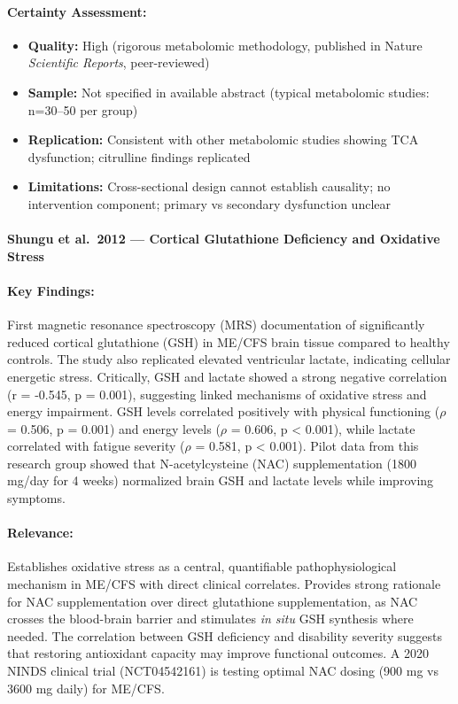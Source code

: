 \paragraph{Certainty Assessment:}
\begin{itemize}
    \item \textbf{Quality:} High (rigorous metabolomic methodology, published in Nature \emph{Scientific Reports}, peer-reviewed)
    \item \textbf{Sample:} Not specified in available abstract (typical metabolomic studies: n=30--50 per group)
    \item \textbf{Replication:} Consistent with other metabolomic studies showing TCA dysfunction; citrulline findings replicated
    \item \textbf{Limitations:} Cross-sectional design cannot establish causality; no intervention component; primary vs secondary dysfunction unclear
\end{itemize}

\paragraph{Shungu et al.\ 2012 --- Cortical Glutathione Deficiency and Oxidative Stress}

\cite{Shungu2012glutathione}

\paragraph{Key Findings:}
First magnetic resonance spectroscopy (MRS) documentation of significantly reduced cortical glutathione (GSH) in ME/CFS brain tissue compared to healthy controls. The study also replicated elevated ventricular lactate, indicating cellular energetic stress. Critically, GSH and lactate showed a strong negative correlation (r = -0.545, p = 0.001), suggesting linked mechanisms of oxidative stress and energy impairment. GSH levels correlated positively with physical functioning ($\rho$ = 0.506, p = 0.001) and energy levels ($\rho$ = 0.606, p < 0.001), while lactate correlated with fatigue severity ($\rho$ = 0.581, p < 0.001). Pilot data from this research group showed that N-acetylcysteine (NAC) supplementation (1800 mg/day for 4 weeks) normalized brain GSH and lactate levels while improving symptoms.

\paragraph{Relevance:}
Establishes oxidative stress as a central, quantifiable pathophysiological mechanism in ME/CFS with direct clinical correlates. Provides strong rationale for NAC supplementation over direct glutathione supplementation, as NAC crosses the blood-brain barrier and stimulates \emph{in situ} GSH synthesis where needed. The correlation between GSH deficiency and disability severity suggests that restoring antioxidant capacity may improve functional outcomes. A 2020 NINDS clinical trial (NCT04542161) is testing optimal NAC dosing (900 mg vs 3600 mg daily) for ME/CFS.

